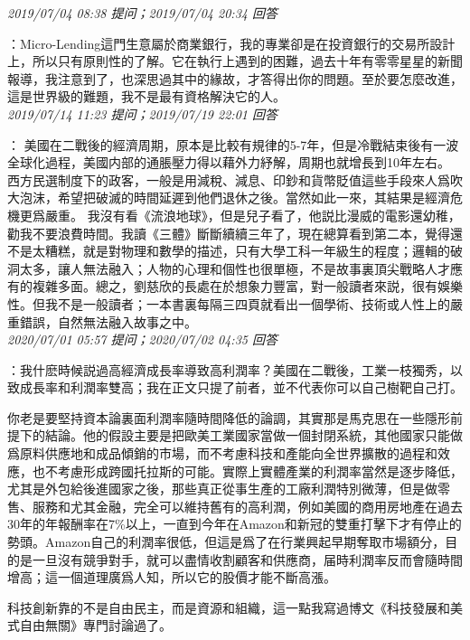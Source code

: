 \documentclass[twocolumn]{ctexart}
\begin{document}
\textit{\hfill\noindent\small 2019/07/04 08:38 提问；2019/07/04 20:34 回答}

：Micro-Lending這門生意屬於商業銀行，我的專業卻是在投資銀行的交易所設計上，所以只有原則性的了解。它在執行上遇到的困難，過去十年有零零星星的新聞報導，我注意到了，也深思過其中的緣故，才答得出你的問題。至於要怎麼改進，這是世界級的難題，我不是最有資格解決它的人。
\\

\textit{\hfill\noindent\small 2019/07/14 11:23 提问；2019/07/19 22:01 回答}

：
美國在二戰後的經濟周期，原本是比較有規律的5-7年，但是冷戰結束後有一波全球化過程，美國内部的通脹壓力得以藉外力紓解，周期也就增長到10年左右。 
西方民選制度下的政客，一般是用減稅、減息、印鈔和貨幣貶值這些手段來人爲吹大泡沫，希望把破滅的時間延遲到他們退休之後。當然如此一來，其結果是經濟危機更爲嚴重。 
我沒有看《流浪地球》，但是兒子看了，他説比漫威的電影還幼稚，勸我不要浪費時間。我讀《三體》斷斷續續三年了，現在總算看到第二本，覺得還不是太糟糕，就是對物理和數學的描述，只有大學工科一年級生的程度；邏輯的破洞太多，讓人無法融入；人物的心理和個性也很單極，不是故事裏頂尖戰略人才應有的複雜多面。總之，劉慈欣的長處在於想象力豐富，對一般讀者來説，很有娛樂性。但我不是一般讀者；一本書裏每隔三四頁就看出一個學術、技術或人性上的嚴重錯誤，自然無法融入故事之中。
\\

\textit{\hfill\noindent\small 2020/07/01 05:57 提问；2020/07/02 04:35 回答}

：我什麽時候説過高經濟成長率導致高利潤率？美國在二戰後，工業一枝獨秀，以致成長率和利潤率雙高；我在正文只提了前者，並不代表你可以自己樹靶自己打。

你老是要堅持資本論裏面利潤率隨時間降低的論調，其實那是馬克思在一些隱形前提下的結論。他的假設主要是把歐美工業國家當做一個封閉系統，其他國家只能做爲原料供應地和成品傾銷的市場，而不考慮科技和產能向全世界擴散的過程和效應，也不考慮形成跨國托拉斯的可能。實際上實體產業的利潤率當然是逐步降低，尤其是外包給後進國家之後，那些真正從事生產的工廠利潤特別微薄，但是做零售、服務和尤其金融，完全可以維持舊有的高利潤，例如美國的商用房地產在過去30年的年報酬率在7\%以上，一直到今年在Amazon和新冠的雙重打擊下才有停止的勢頭。Amazon自己的利潤率很低，但這是爲了在行業興起早期奪取市場額分，目的是一旦沒有競爭對手，就可以盡情收割顧客和供應商，届時利潤率反而會隨時間增高；這一個道理廣爲人知，所以它的股價才能不斷高漲。

科技創新靠的不是自由民主，而是資源和組織，這一點我寫過博文《科技發展和美式自由無關》專門討論過了。
\end{document}
